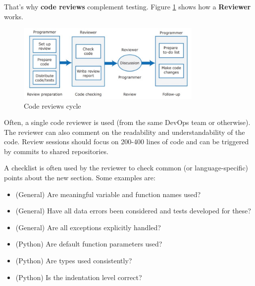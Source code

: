 \noindent That's why \textbf{code reviews} complement testing. Figure \ref{fig:reviewer} shows how a \textbf{Reviewer} works.

\begin{figure} [H]
    \centering
    \includegraphics[width=0.8\textwidth]{images/Testing/reviewer.PNG}
    \caption{Code reviews cycle}
    \label{fig:reviewer}
\end{figure} 

Often, a single code reviewer is used (from the same DevOps team or otherwise). The reviewer can also comment on the readability and understandability of the code. Review sessions should focus on 200-400 lines of code and can be triggered by commits to shared repositories.

A checklist is often used by the reviewer to check common (or language-specific) points about the new section. Some examples are:
\begin{itemize}
    \item (General) Are meaningful variable and function names used?
    \item (General) Have all data errors been considered and tests developed for these?
    \item (General) Are all exceptions explicitly handled?
    \item (Python) Are default function parameters used?
    \item (Python) Are types used consistently?
    \item (Python) Is the indentation level correct?
\end{itemize}
